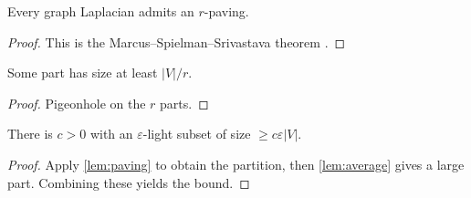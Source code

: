 \documentclass{article}
\begin{document}
\begin{lemma}\label{lem:paving}
Every graph Laplacian admits an $r$-paving.
\end{lemma}
\begin{proof}
This is the Marcus--Spielman--Srivastava theorem \cite{mss2015}.
\end{proof}

\begin{lemma}\label{lem:average}
Some part has size at least $|V|/r$.
\end{lemma}
\begin{proof}
Pigeonhole on the $r$ parts.
\end{proof}

\begin{theorem}\label{thm:main}
There is $c>0$ with an $\varepsilon$-light subset of size $\ge c\varepsilon|V|$.
\end{theorem}
\begin{proof}
Apply \ref{lem:paving} to obtain the partition, then \ref{lem:average}
gives a large part. Combining these yields the bound.
\end{proof}
\end{document}
